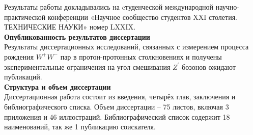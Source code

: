 Результаты работы докладывались на cтуденческой международной научно-практической конференции «Научное сообщество студентов XXI столетия. ТЕХНИЧЕСКИЕ НАУКИ» номер LXXIX.
\\

\vspace{5cm}
\textbf{Опубликованность результатов диссертации}\\

Результаты диссертационных исследований, связанных с измерением процесса рождения ${W}^{+}{W}^{-}$ пар в протон-протонных столкновениях и получены экспериментальные ограничения на угол смешивания ${Z}^{\prime}$-бозонов  ожидают публикаций.
\\

\textbf{Структура и объем диссертации}\\

Диссертационная работа состоит из введения, четырёх глав, заключения и библиографического списка. Объем диссертации – 75 листов, включая 3 приложения и 46 иллюстраций. Библиографический список содержит 18 наименований, так же 1 публикацию соискателя.
